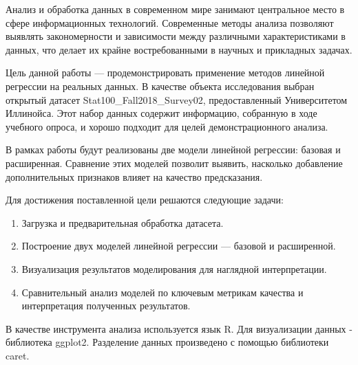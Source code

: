 Анализ и обработка данных в современном мире занимают центральное место в сфере информационных технологий. Современные методы анализа позволяют выявлять закономерности и зависимости между различными характеристиками в данных, что делает их крайне востребованными в научных и прикладных задачах.

Цель данной работы — продемонстрировать применение методов линейной регрессии на реальных данных. В качестве объекта исследования выбран открытый датасет Stat100\_Fall2018\_Survey02, предоставленный Университетом Иллинойса. Этот набор данных содержит информацию, собранную в ходе учебного опроса, и хорошо подходит для целей демонстрационного анализа.

В рамках работы будут реализованы две модели линейной регрессии: базовая и расширенная. Сравнение этих моделей позволит выявить, насколько добавление дополнительных признаков влияет на качество предсказания.

Для достижения поставленной цели решаются следующие задачи:

\begin{enumerate}
	\item Загрузка и предварительная обработка датасета.
	\item Построение двух моделей линейной регрессии — базовой и расширенной.
	\item Визуализация результатов моделирования для наглядной интерпретации.
	\item Сравнительный анализ моделей по ключевым метрикам качества и интерпретация полученных результатов.
\end{enumerate}

В качестве инструмента анализа используется язык R\cite{metloff2019}. Для визуализации данных - библиотека ggplot2\cite{mastitsky2017}. Разделение данных произведено с помощью библиотеки caret\cite{caret2019}.